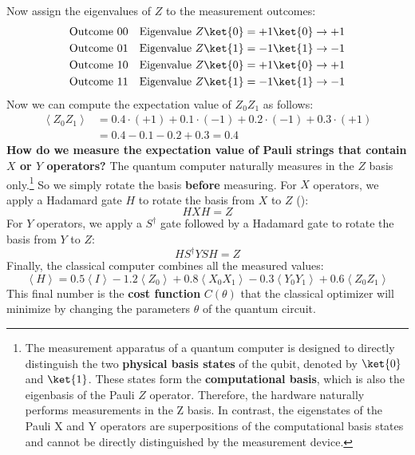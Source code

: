 Now assign the eigenvalues of $Z$ to the measurement outcomes:
\begin{equation*}
    \begin{aligned}
        \text{Outcome } 00 &\quad \text{Eigenvalue } Z\ket{0} = +1\ket{0} \to +1 \\
        \text{Outcome } 01 &\quad \text{Eigenvalue } Z\ket{1} = -1\ket{1} \to -1 \\
        \text{Outcome } 10 &\quad \text{Eigenvalue } Z\ket{0} = +1\ket{0} \to +1 \\
        \text{Outcome } 11 &\quad \text{Eigenvalue } Z\ket{1} = -1\ket{1} \to -1
    \end{aligned}
\end{equation*}
Now we can compute the expectation value of $Z_0 Z_1$ as follows:
\begin{equation*}
    \begin{aligned}
        \left\langle Z_0 Z_1 \right\rangle &= 0.4 \cdot (+1) + 0.1 \cdot (-1) + 0.2 \cdot (-1) + 0.3 \cdot (+1) \\
        &= 0.4 - 0.1 - 0.2 + 0.3 = 0.4
    \end{aligned}
\end{equation*}
\textcolor{Green3}{ \textbf{How do we measure the expectation value of Pauli strings that contain $X$ or $Y$ operators?}} The quantum computer naturally measures in the $Z$ basis only.\footnote{%
    The measurement apparatus of a quantum computer is designed to directly distinguish the two \textbf{physical basis states} of the qubit, denoted by $\ket{0}$ and $\ket{1}$. These states form the \textbf{computational basis}, which is also the eigenbasis of the Pauli $Z$ operator. Therefore, the hardware naturally performs measurements in the Z basis. In contrast, the eigenstates of the Pauli X and Y operators are superpositions of the computational basis states and cannot be directly distinguished by the measurement device.%
} So we simply rotate the basis \textbf{before} measuring. For $X$ operators, we apply a Hadamard gate $H$ to rotate the basis from $X$ to $Z$ ():
\begin{equation*}
    H X H = Z
\end{equation*}
For $Y$ operators, we apply a $S^\dagger$ gate followed by a Hadamard gate to rotate the basis from $Y$ to $Z$:
\begin{equation*}
    H S^\dagger Y S H = Z
\end{equation*}
Finally, the classical computer combines all the measured values:
\begin{equation*}
    \left\langle H \right\rangle = 0.5 \left\langle I \right\rangle - 1.2 \left\langle Z_0 \right\rangle + 0.8 \left\langle X_0 X_1 \right\rangle - 0.3 \left\langle Y_0 Y_1 \right\rangle + 0.6 \left\langle Z_0 Z_1 \right\rangle
\end{equation*}
This final number is the \textbf{cost function} $C(\theta)$ that the classical optimizer will minimize by changing the parameters $\theta$ of the quantum circuit.

